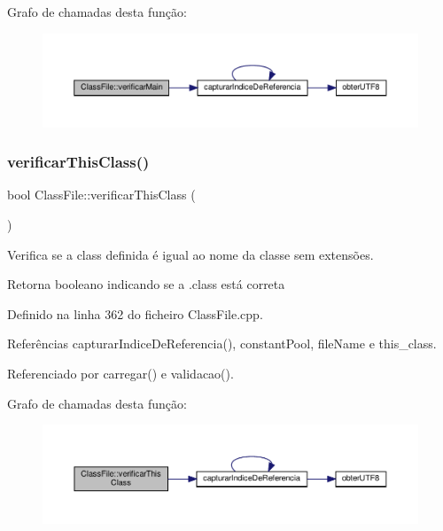 Grafo de chamadas desta função\+:
\nopagebreak
\begin{figure}[H]
\begin{center}
\leavevmode
\includegraphics[width=350pt]{classClassFile_ae8e4445e763c4ee7c04995fcea0369e0_cgraph}
\end{center}
\end{figure}
\mbox{\label{classClassFile_a6b8f23db0ee4af80a2e75d46a191dc20}} 
\subsubsection{\texorpdfstring{verificar\+This\+Class()}{verificarThisClass()}}
{\footnotesize\ttfamily bool Class\+File\+::verificar\+This\+Class (\begin{DoxyParamCaption}{ }\end{DoxyParamCaption})}



Verifica se a class definida é igual ao nome da classe sem extensões. 

\begin{DoxyReturn}{Retorna}
booleano indicando se a .class está correta 
\end{DoxyReturn}


Definido na linha 362 do ficheiro Class\+File.\+cpp.



Referências capturar\+Indice\+De\+Referencia(), constant\+Pool, file\+Name e this\+\_\+class.



Referenciado por carregar() e validacao().

Grafo de chamadas desta função\+:
\nopagebreak
\begin{figure}[H]
\begin{center}
\leavevmode
\includegraphics[width=350pt]{classClassFile_a6b8f23db0ee4af80a2e75d46a191dc20_cgraph}
\end{center}
\end{figure}


